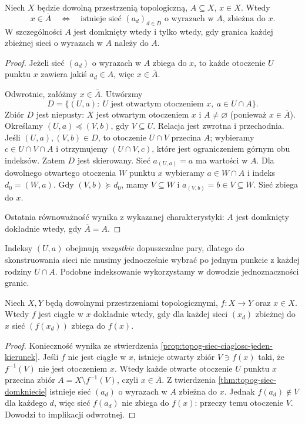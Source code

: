 \begin{twierdzenie}
\label{thm:topog-siec-domkniecie}
Niech $X$ będzie dowolną przestrzenią topologiczną,
$A\subseteq X$, $x\in X$. Wtedy
\[
 x\in\overline A
 \quad\Longleftrightarrow\quad
 \text{istnieje sieć $(a_d)_{d\in D}$ o wyrazach w $A$,
 zbieżna do $x$}.
\]
W szczególności $A$ jest domknięty wtedy i tylko wtedy,
gdy granica każdej zbieżnej sieci o wyrazach w $A$
należy do $A$.
\end{twierdzenie}
\begin{proof}
Jeżeli sieć $(a_d)$ o wyrazach w $A$ zbiega do $x$,
to każde otoczenie $U$ punktu $x$ zawiera jakiś
$a_d\in A$, więc $x\in\overline A$.

Odwrotnie, załóżmy $x\in\overline A$. Utwórzmy
\[
 D=\{(U,a):\ U\text{ jest otwartym otoczeniem }x,
                         \ a\in U\cap A\}.
\]
Zbiór $D$ jest niepusty: $X$ jest otwartym otoczeniem
$x$ i $A\ne\varnothing$ (ponieważ $x\in\overline A$).
Określamy $(U,a)\preceq(V,b)$, gdy $V\subseteq U$.
Relacja jest zwrotna i przechodnia. Jeśli
$(U,a),(V,b)\in D$, to otoczenie $U\cap V$ przecina $A$;
wybieramy $c\in U\cap V\cap A$ i otrzymujemy
$(U\cap V,c)$, które jest ograniczeniem górnym obu indeksów.
Zatem $D$ jest skierowany.
Sieć $a_{(U,a)}=a$ ma wartości w $A$.
Dla dowolnego otwartego otoczenia $W$ punktu $x$
wybieramy $a\in W\cap A$ i indeks $d_0=(W,a)$.
Gdy $(V,b)\succeq d_0$, mamy $V\subseteq W$
i $a_{(V,b)}=b\in V\subseteq W$. Sieć zbiega do $x$.

Ostatnia równoważność wynika z wykazanej charakterystyki:
$A$ jest domknięty dokładnie wtedy, gdy
$\overline A=A$.
\end{proof}

\begin{uwaga}
\label{rem:topog-siec-bez-wyboru}
Indeksy $(U,a)$ obejmują \emph{wszystkie} dopuszczalne
pary, dlatego do skonstruowania sieci nie musimy
jednocześnie wybrać po jednym punkcie z każdej rodziny
$U\cap A$. Podobne indeksowanie wykorzystamy w dowodzie
jednoznaczności granic.
\end{uwaga}

\begin{twierdzenie}
\label{thm:topog-siec-kryterium-ciaglosci}
Niech $X,Y$ będą dowolnymi przestrzeniami topologicznymi,
$f\colon X\to Y$ oraz $x\in X$. Wtedy $f$ jest ciągłe w $x$
dokładnie wtedy, gdy dla każdej sieci $(x_d)$ zbieżnej
do $x$ sieć $(f(x_d))$ zbiega do $f(x)$.
\end{twierdzenie}
\begin{proof}
Konieczność wynika ze stwierdzenia
\ref{prop:topog-siec-ciaglosc-jeden-kierunek}.
Jeśli $f$ nie jest ciągłe w $x$, istnieje otwarty
zbiór $V\ni f(x)$ taki, że $f^{-1}(V)$ nie jest
otoczeniem $x$. Wtedy każde otwarte otoczenie $U$
punktu $x$ przecina zbiór
$A=X\setminus f^{-1}(V)$, czyli $x\in\overline A$.
Z twierdzenia \ref{thm:topog-siec-domkniecie} istnieje
sieć $(a_d)$ o wyrazach w $A$ zbieżna do $x$.
Jednak $f(a_d)\notin V$ dla każdego $d$, więc sieć
$f(a_d)$ nie zbiega do $f(x)$: przeczy temu otoczenie $V$.
Dowodzi to implikacji odwrotnej.
\end{proof}

